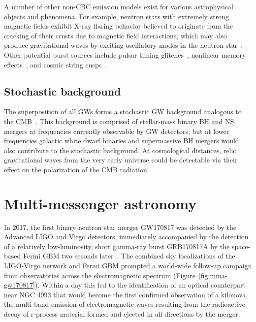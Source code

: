 A number of other non-CBC emission models exist for various astrophysical objects and phenomena.
For example, neutron stars with extremely strong magnetic fields exhibit X-ray flaring behavior believed to originate from the cracking of their crusts due to magnetic field interactions, which may also produce gravitational waves by exciting oscillatory modes in the neutron star~\citep{Lasky_2015}.
Other potential burst sources include pulsar timing glitches~\citep{pulsar_s5}, nonlinear memory effects~\citep{memory_o2}, and cosmic string cusps~\citep{strings_o3}.


\subsection{Stochastic background}

The superposition of all \acp{GW} forms a stochastic \ac{GW} background analogous to the \ac{CMB}~\citep{Christensen_2018}.
This background is comprised of stellar-mass binary \ac{BH} and \ac{NS} mergers at frequencies currently observable by \ac{GW} detectors, but at lower frequencies galactic white dwarf binaries and supermassive BH mergers would also contribute to the stochastic background.
At cosmological distances, relic gravitational waves from the very early universe could be detectable via their effect on the polarization of the \ac{CMB} radiation.


\section{Multi-messenger astronomy}\label{sec:mma}

In 2017, the first binary neutron star merger GW170817 was detected by the Advanced LIGO and Virgo detectors, immediately accompanied by the detection of a relatively low-luminosity, short gamma-ray burst GRB170817A by the space-based Fermi \ac{GBM} two seconds later~\citep{gw170817}.
The combined sky localizations of the LIGO-Virgo network and Fermi GBM prompted a world-wide follow-up campaign from observatories across the electromagnetic spectrum (Figure~\ref{fig:mma-gw170817}).
Within a day this led to the identification of an optical counterpart near NGC 4993 that would become the first confirmed observation of a kilonova, the multi-band emission of electromagnetic waves resulting from the radioactive decay of r-process material formed and ejected in all directions by the merger.

